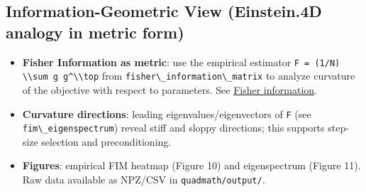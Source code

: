 \documentclass[
  10pt,
]{article}
\newcommand{\passthrough}[1]{#1}
\providecommand{\tightlist}{%
  \setlength{\itemsep}{0pt}\setlength{\parskip}{0pt}}
\begin{document}
\hypertarget{information-geometric-view-einstein.4d-analogy-in-metric-form}{%
\subsection{Information-Geometric View (Einstein.4D analogy in metric
form)}\label{information-geometric-view-einstein.4d-analogy-in-metric-form}}

\begin{itemize}
\tightlist
\item
  \textbf{Fisher Information as metric}: use the empirical estimator
  \passthrough{\lstinline!F = (1/N) \\sum g g^\\top!} from
  \passthrough{\lstinline!fisher\_information\_matrix!} to analyze
  curvature of the objective with respect to parameters. See
  \href{https://en.wikipedia.org/wiki/Fisher_information}{Fisher
  information}.
\item
  \textbf{Curvature directions}: leading eigenvalues/eigenvectors of
  \passthrough{\lstinline!F!} (see
  \passthrough{\lstinline!fim\_eigenspectrum!}) reveal stiff and sloppy
  directions; this supports step-size selection and preconditioning.
\item
  \textbf{Figures}: empirical FIM heatmap (Figure 10) and eigenspectrum
  (Figure 11). Raw data available as NPZ/CSV in
  \passthrough{\lstinline!quadmath/output/!}.
\end{itemize}
\end{document}
